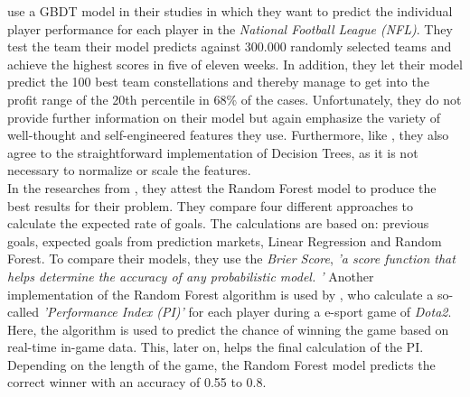 \citet{landers_machine_2017} use a GBDT model in their studies in which they want to predict the individual player performance for each player in the \emph{National Football League (NFL)}. They test the team their model predicts against 300.000 randomly selected teams and achieve the highest scores in five of eleven weeks. In addition, they let their model predict the 100 best team constellations and thereby manage to get into the profit range of the 20th percentile in 68\% of the cases. Unfortunately, they do not provide further information on their model but again emphasize the variety of well-thought and self-engineered features they use. Furthermore, like \citeauthor{deng_analysis_2020}, they also agree to the straightforward implementation of Decision Trees, as it is not necessary to normalize or scale the features. \parencite[cf.][, p. 6]{landers_machine_2017} \\
In the researches from \citet{shah_poisson_2021}, they attest the Random Forest model to produce the best results for their problem. They compare four different approaches to calculate the expected rate of goals. The calculations are based on: previous goals, expected goals from prediction markets, Linear Regression and Random Forest. To compare their models, they use the \emph{Brier Score}, \emph{'a score function that helps determine the accuracy of any probabilistic model. '} \parencite[, p. 7]{shah_poisson_2021} Another implementation of the Random Forest algorithm is used by \citet{demediuk_performance_2021}, who calculate a so-called \emph{'Performance Index (PI)'} for each player during a e-sport game of \emph{Dota2}. Here, the algorithm is used to predict the chance of winning the game based on real-time in-game data. This, later on, helps the final calculation of the PI. Depending on the length of the game, the Random Forest model predicts the correct winner with an accuracy of 0.55 to 0.8. \\
